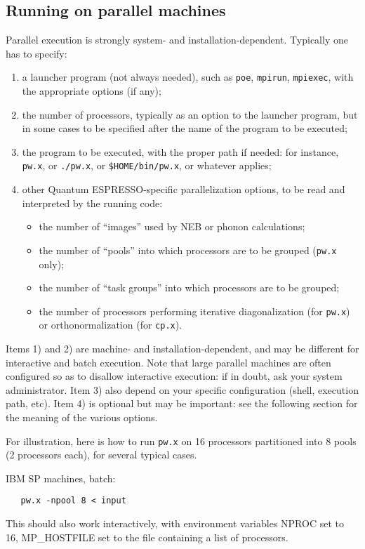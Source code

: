 \documentclass[12pt,a4paper]{article}
\def\qe{{\sc Quantum ESPRESSO}}
\def\pw.x{\texttt{pw.x}}
\def\cp.x{\texttt{cp.x}}
\begin{document}
\subsection{Running on parallel machines}
\label{SubSec:para}

Parallel execution is strongly system- and installation-dependent. 
Typically one has to specify:
\begin{enumerate}
\item a launcher program (not always needed), 
such as \texttt{poe}, \texttt{mpirun}, \texttt{mpiexec},
  with the  appropriate options (if any);
\item the number of processors, typically as an option to the launcher
  program, but in some cases to be specified after the name of the
  program to be
  executed; 
\item the program to be executed, with the proper path if needed: for
  instance, \pw.x, or \texttt{./pw.x}, or \texttt{\$HOME/bin/pw.x}, or
  whatever applies; 
\item other \qe-specific parallelization options, to be
  read and interpreted by the running code: 
\begin{itemize}
\item the number of ``images'' used by NEB or phonon calculations;
\item the number of ``pools'' into which processors are to be grouped
  (\pw.x only);
\item the number of ``task groups'' into which processors are to be
  grouped;
\item the number of processors performing iterative diagonalization
  (for \pw.x) or orthonormalization (for \cp.x).
\end{itemize}
\end{enumerate}
Items 1) and 2) are machine- and installation-dependent, and may be 
different for interactive and batch execution. Note that large
parallel machines are  often configured so as to disallow interactive
execution: if in doubt, ask your system administrator.
Item 3) also depend on your specific configuration (shell, execution
path, etc). 
Item 4) is optional but may be important: see the following section
for the meaning of the various options.

For illustration, here is how to run \pw.x on 16 processors partitioned into
8 pools (2 processors each), for several typical cases. 

IBM SP machines, batch:
\begin{verbatim}
   pw.x -npool 8 < input
\end{verbatim}
This should also work interactively, with environment variables NPROC
set to 16, MP\_HOSTFILE set to the file containing a list of processors.
\end{document}
